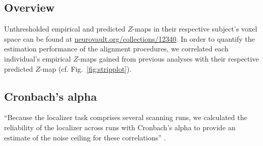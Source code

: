



\subsection{Overview}



%
Unthresholded empirical and predicted $Z$-maps in their respective subject's
voxel space can be found at
\href{https://identifiers.org/neurovault.collection:12340}{\url{neurovault.org/collections/12340}}.
%
In order to quantify the estimation performance of the alignment procedures, we
correlated each individual's empirical $Z$-maps gained from previous analyses
\citep{sengupta2016extension, haeusler2022processing} with their respective
predicted $Z$-map (cf. Fig.~\ref{fig:stripplot}).


\subsection{Cronbach's alpha}




%
``Because the localizer task comprises several scanning runs, we calculated the
reliability of the localizer across runs with Cronbach's alpha to provide an
estimate of the noise ceiling for these correlations'' \citep{jiahui2022cross}.


